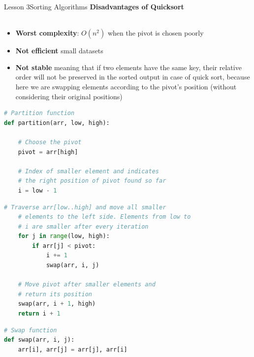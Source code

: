 \documentclass[aspectratio=1610]{beamer}
\begin{document}
\begin{frame}{Lesson 3}{Sorting Algorithms}
\LARGE
\textbf{Disadvantages of Quicksort}\\~\\
\Large
\begin{itemize}
	\item \textbf{Worst complexity}: $O(n^{2})$ when the pivot is chosen poorly
	\item \textbf{Not efficient} small datasets
	\item \textbf{Not stable} meaning that if two elements have the same key, their relative order will not be preserved in the sorted output in case of quick sort, because here we are swapping elements according to the pivot’s position (without considering their original positions)
\end{itemize}
\end{frame}



\begin{frame}[fragile]
\begin{lstlisting}[language=Python]
# Partition function
def partition(arr, low, high):
    
    # Choose the pivot
    pivot = arr[high]
    
    # Index of smaller element and indicates 
    # the right position of pivot found so far
    i = low - 1
\end{lstlisting}
\end{frame}
    
    
\begin{frame}[fragile]
\begin{lstlisting}[language=Python]    
    # Traverse arr[low..high] and move all smaller
    # elements to the left side. Elements from low to 
    # i are smaller after every iteration
    for j in range(low, high):
        if arr[j] < pivot:
            i += 1
            swap(arr, i, j)
    
    # Move pivot after smaller elements and
    # return its position
    swap(arr, i + 1, high)
    return i + 1
\end{lstlisting}
\end{frame}




\begin{frame}[fragile]
\begin{lstlisting}[language=Python]
# Swap function
def swap(arr, i, j):
    arr[i], arr[j] = arr[j], arr[i]
\end{lstlisting}
\end{frame}
\end{document}
